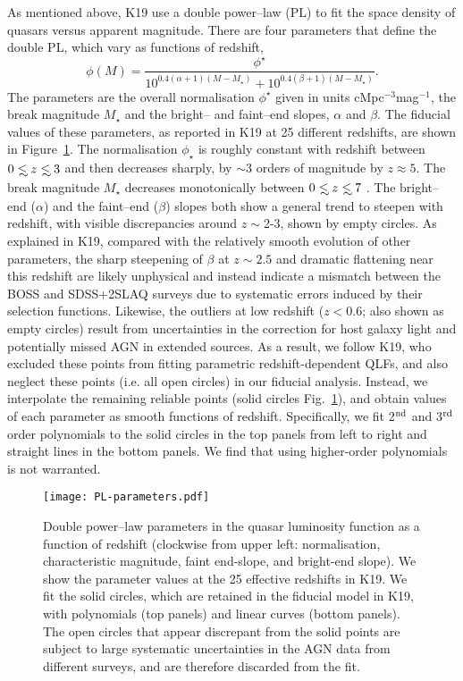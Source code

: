 \documentclass[fleqn,usenatbib]{mnras}
\newcommand\lsim{\mathrel{\rlap{\lower4pt\hbox{\hskip1pt$\sim$}}
        \raise1pt\hbox{$<$}}}
\begin{document}
As mentioned above, K19 use a double power--law (PL) to fit the space density of quasars versus apparent magnitude. There are four parameters that define the double PL, which vary as functions of redshift, 
\begin{equation} \label{eq:qlf}
    \phi(M)=\frac{\phi^{\star}}{10^{0.4(\alpha+1)(M-M_{\star})}+10^{0.4(\beta+1)(M-M_{\star})}}.
\end{equation}
The parameters are the overall normalisation $\phi^{\star}$ given in units cMpc$^{-3}$mag$^{-1}$, the break magnitude $M_{\star}$ and the bright-- and faint--end slopes, $\alpha$ and $\beta$.
The fiducial values of these parameters, as reported in K19 at 25 different redshifts, are shown in Figure~\ref{fig:parameters}. The normalisation $\phi_{\star}$ is roughly constant with redshift
between $0\lsim z\lsim 3$ and then decreases sharply, by $\sim$3 orders of magnitude by $z\approx 5$. The break magnitude $M_{\star}$ decreases monotonically between $0\lsim z\lsim 7$ . The bright--end ($\alpha$) and the faint--end ($\beta$) slopes both show a general trend to steepen with redshift, with visible discrepancies around $z\sim$2-3, shown by empty circles.  As explained in K19, compared with the relatively smooth evolution of other parameters, the sharp steepening of $\beta$ at $z\sim 2.5$ and dramatic flattening near this redshift are likely unphysical and instead indicate a mismatch between the BOSS and SDSS+2SLAQ surveys due to systematic errors induced by their selection functions. Likewise, the outliers at low redshift ($z<0.6$; also shown as empty circles) result from uncertainties in the correction for host galaxy light and potentially missed AGN in extended sources. As a result, we follow K19, who excluded these points from fitting parametric redshift-dependent QLFs,  and also neglect these points (i.e. all open circles) 
in our fiducial analysis.
Instead, we interpolate the remaining reliable points (solid circles Fig.~\ref{fig:parameters}), and obtain values of each parameter as smooth functions of redshift. Specifically, we fit 2$^{\rm nd}$ and 3$^{\rm rd}$ order polynomials to the solid circles in the top panels from left to right and straight lines in the bottom panels.  We find that using higher-order polynomials is not warranted.
\begin{figure}
    \centering
    \texttt{[image: PL-parameters.pdf]}
    \caption{Double power--law parameters in the quasar luminosity function as a function of redshift (clockwise from upper left: normalisation, characteristic magnitude, faint end-slope, and bright-end slope). We show the parameter values at the 25 effective redshifts in K19. We fit the solid circles, which are retained in the fiducial model in K19, with polynomials (top panels) and linear curves (bottom panels). The open circles that appear discrepant from the solid points are subject to large systematic uncertainties in the AGN data from different surveys, and are therefore discarded from the fit. }
    \label{fig:parameters}
\end{figure}
 
\end{document}
